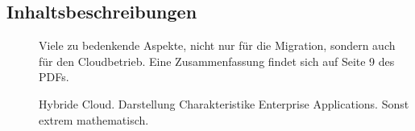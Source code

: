 \subsection{Inhaltsbeschreibungen}
\begin{description}
	
\item[] Viele 
zu bedenkende Aspekte, nicht nur für die Migration, sondern auch für den 
Cloudbetrieb. Eine Zusammenfassung findet sich auf Seite 9 des PDFs.
\item[] Hybride 
Cloud. Darstellung Charakteristike Enterprise Applications. Sonst extrem 
mathematisch.
\end{description}


